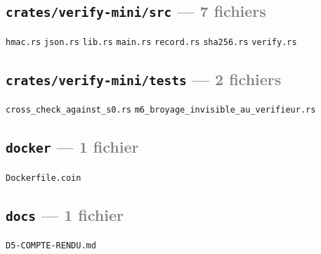 \documentclass[10pt]{report}
\newcommand{\code}[1]{\texttt{\small #1}}
\begin{document}
\subsection*{\code{crates/verify-mini/src} \normalfont\textcolor{grey}{--- 7 fichiers}}
\begin{sloppypar}\footnotesize\raggedright
\code{hmac.rs} \;\textbullet\; \code{json.rs} \;\textbullet\; \code{lib.rs} \;\textbullet\; \code{main.rs} \;\textbullet\; \code{record.rs} \;\textbullet\; \code{sha256.rs} \;\textbullet\; \code{verify.rs}
\end{sloppypar}

\subsection*{\code{crates/verify-mini/tests} \normalfont\textcolor{grey}{--- 2 fichiers}}
\begin{sloppypar}\footnotesize\raggedright
\code{cross\_check\_against\_s0.rs} \;\textbullet\; \code{m6\_broyage\_invisible\_au\_verifieur.rs}
\end{sloppypar}

\subsection*{\code{docker} \normalfont\textcolor{grey}{--- 1 fichier}}
\begin{sloppypar}\footnotesize\raggedright
\code{Dockerfile.coin}
\end{sloppypar}

\subsection*{\code{docs} \normalfont\textcolor{grey}{--- 1 fichier}}
\begin{sloppypar}\footnotesize\raggedright
\code{D5-COMPTE-RENDU.md}
\end{sloppypar}
\end{document}
